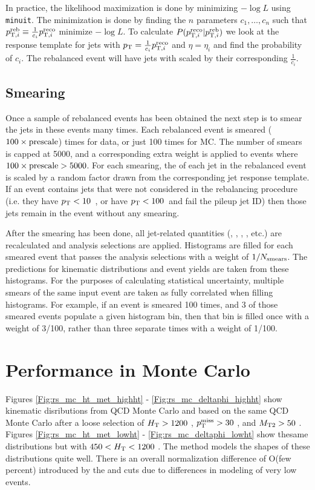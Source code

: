 In practice, the likelihood maximization is done by minimizing $-\log L$ using \texttt{minuit}.
The minimization is done by finding the $n$ parameters $c_1,\dots,c_n$ such that
$p_{\mathrm{T},i}^{\mathrm{reb}}\equiv\frac{1}{c_i}p_{\mathrm{T},i}^{\mathrm{reco}}$ minimize $-\log L$. To calculate
$P(p_{\mathrm{T},i}^{\mathrm{reco}}|p_{\mathrm{T},i}^{\mathrm{reb}})$ we look at the response template for jets with $p_{\mathrm{T}}=\frac{1}{c_i}p_{\mathrm{T},i}^{\mathrm{reco}}$
and $\eta=\eta_i$ and find the probability of $c_i$. The rebalanced event will have jets with \pt
scaled by their corresponding $\frac{1}{c_i}$.

\subsection{Smearing}

Once a sample of rebalanced events has been obtained the next step is to smear the jets in these events many times. 
Each rebalanced event is smeared ($100 \times\mathrm{prescale}$) times for data, or just 100 times for MC.
The number of smears is capped at 5000, and a corresponding extra weight is applied to events where $100 \times\mathrm{prescale}>5000$.
For each smearing, the \pt of each jet in the rebalanced event is scaled by a random factor drawn from the corresponding jet response template. If an event
contains jets that were not considered in the rebalancing procedure (i.e. they have $p_{\mathrm{T}}<10$~\GeV, or have $p_{\mathrm{T}}<100$~\GeV and fail the pileup jet ID) 
then those jets remain in the event without any smearing. 

After the smearing has been done, all jet-related quantities (\Ht, \ptmiss, \mttwo, \dpmin, etc.) 
are recalculated and analysis selections are applied. Histograms are filled for each smeared event that passes the analysis
selections with a weight of $1/N_{\mathrm{smears}}$. The \rs predictions for kinematic distributions and event yields are taken from these histograms.
For the purposes of calculating statistical uncertainty, multiple smears of the same input event are taken as fully correlated when filling histograms. For example, if an event
is smeared 100 times, and 3 of those smeared events populate a given histogram bin, then that bin is filled once with a weight of 3/100, rather than three separate
times with a weight of 1/100.

\section{Performance in Monte Carlo}

Figures \ref{Fig:rs_mc_ht_met_highht} - \ref{Fig:rs_mc_deltaphi_highht} show kinematic disributions from QCD Monte Carlo
and \rs based on the same QCD Monte Carlo after a loose selection of $H_{\mathrm{T}} > 1200$ \GeV, $p_{\mathrm{T}}^{\mathrm{miss}} > 30$ \GeV, and $M_{\mathrm{T2}} > 50$ \GeV.
Figures \ref{Fig:rs_mc_ht_met_lowht} - \ref{Fig:rs_mc_deltaphi_lowht} show thesame distributions but with $450 < H_{\mathrm{T}} < 1200$ \GeV.
The \rs method models the shapes of these distributions quite well. There is an overall normalization difference of O(few percent)
introduced by the \ptmiss and \mttwo cuts due to differences in modeling of very low \ptmiss events.

